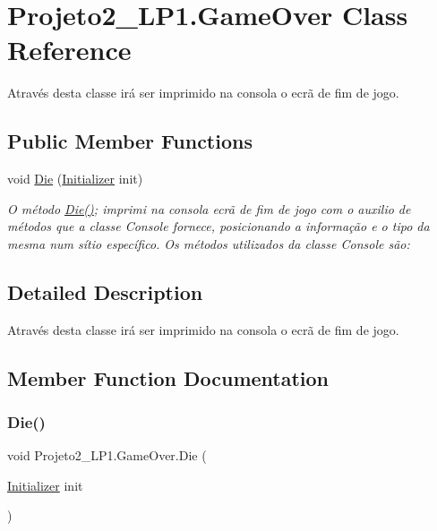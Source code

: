 \hypertarget{class_projeto2___l_p1_1_1_game_over}{}\section{Projeto2\+\_\+\+L\+P1.\+Game\+Over Class Reference}
\label{class_projeto2___l_p1_1_1_game_over}


Através desta classe irá ser imprimido na consola o ecrã de fim de jogo.  


\subsection*{Public Member Functions}
\begin{DoxyCompactItemize}
\item 
void \mbox{\hyperlink{class_projeto2___l_p1_1_1_game_over_ae6d3127c1715618a0368e441fdd095f7}{Die}} (\mbox{\hyperlink{class_projeto2___l_p1_1_1_initializer}{Initializer}} init)
\begin{DoxyCompactList}\small\item\em O método \mbox{\hyperlink{class_projeto2___l_p1_1_1_game_over_ae6d3127c1715618a0368e441fdd095f7}{Die()}}; imprimi na consola ecrã de fim de jogo com o auxilio de métodos que a classe Console fornece, posicionando a informação e o tipo da mesma num sítio específico. Os métodos utilizados da classe Console são\+: \end{DoxyCompactList}\end{DoxyCompactItemize}


\subsection{Detailed Description}
Através desta classe irá ser imprimido na consola o ecrã de fim de jogo. 



\subsection{Member Function Documentation}
\mbox{\label{class_projeto2___l_p1_1_1_game_over_ae6d3127c1715618a0368e441fdd095f7}} 
\subsubsection{\texorpdfstring{Die()}{Die()}}
{\footnotesize\ttfamily void Projeto2\+\_\+\+L\+P1.\+Game\+Over.\+Die (\begin{DoxyParamCaption}\item[{\mbox{\hyperlink{class_projeto2___l_p1_1_1_initializer}{Initializer}}}]{init }\end{DoxyParamCaption})\hspace{0.3cm}{\ttfamily [inline]}}



